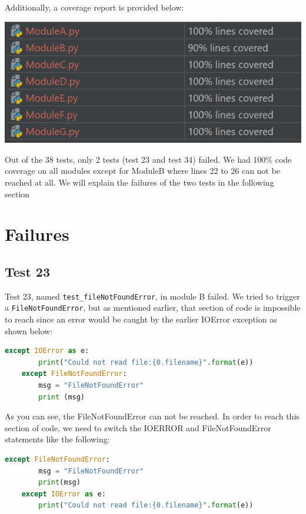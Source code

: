 \documentclass[12pt, letterpaper, titlepage]{article}
\begin{document}
\newpage
Additionally, a coverage report is provided below: \\
\begin{center}
    \includegraphics[scale=1.2]{coverageTable.png} 
\end{center}

Out of the 38 tests, only 2 tests (test 23 and test 34) failed. We had 100\% code coverage on all modules except for ModuleB where lines 22 to 26 can not be reached at all. We will explain the failures of the two tests in the following section

\section{Failures}
\subsection{Test 23}
Test 23, named \lstinline{test_fileNotFoundError}, in module B failed. We tried to trigger a \lstinline{FileNotFoundError}, but as mentioned earlier, that section of code is impossible to reach since an error would be caught by the earlier IOError exception as shown below:
\begin{lstlisting}[language=Python, style=style]
    except IOError as e:
        print("Could not read file:{0.filename}".format(e))
    except FileNotFoundError:
        msg = "FileNotFoundError"
        print (msg)
\end{lstlisting}

As you can see, the FileNotFoundError can not be reached. In order to reach this section of code, we need to switch the IOERROR and FileNotFoundError statements like the following:

\begin{lstlisting}[language=Python, style=style]
    except FileNotFoundError:
        msg = "FileNotFoundError"
        print(msg)
    except IOError as e:
        print("Could not read file:{0.filename}".format(e))
\end{lstlisting}
\end{document}
